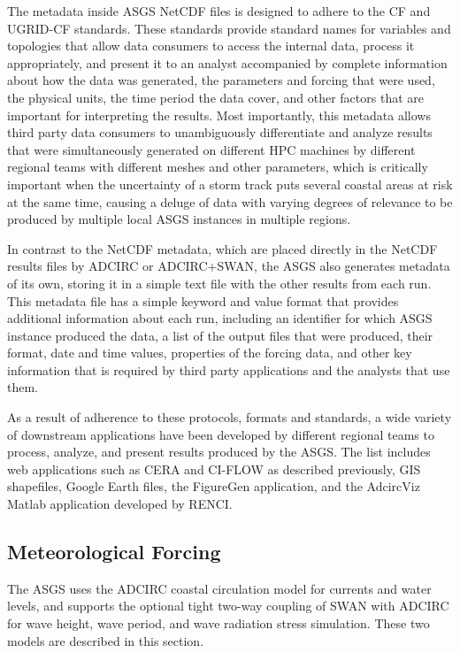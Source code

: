 \documentclass[jmse,article,submit,moreauthors,pdftex,12pt,a4paper]{mdpi}
\begin{document}
The metadata inside ASGS NetCDF files is designed to adhere to the 
CF and UGRID-CF standards. These standards provide standard names 
for variables and topologies that allow data consumers to access the 
internal data, process it appropriately, and present it to an 
analyst accompanied by complete information about how the data was 
generated, the parameters and forcing that were used, the physical 
units, the time period the data cover, and other factors that are 
important for interpreting the results. Most importantly, this 
metadata allows third party data consumers to unambiguously 
differentiate and analyze results that were simultaneously generated 
on different HPC machines by different regional teams with different 
meshes and other parameters, which is critically important when the 
uncertainty of a storm track puts several coastal areas at risk at 
the same time, causing a deluge of data with varying degrees of 
relevance to be produced by multiple local ASGS instances in multiple
regions. 

In contrast to the NetCDF metadata, which are placed directly in the 
NetCDF results files by ADCIRC or ADCIRC+SWAN, the ASGS also 
generates metadata of its own, storing it in a simple text file with 
the other results from each run. This metadata file has a simple 
keyword and value format that provides additional information about 
each run, including an identifier for which ASGS instance produced 
the data, a list of the output files that were produced, their 
format, date and time values, properties of the forcing data, and 
other key information that is required by third party applications 
and the analysts that use them. 

As a result of adherence to these protocols, formats and standards, 
a wide variety of downstream applications have been developed by 
different regional teams to process, analyze, and present results 
produced by the ASGS. The list includes web applications such as 
CERA and CI-FLOW as described previously, GIS shapefiles, Google 
Earth files, the FigureGen\cite{DietrichJC2013} application, and the 
AdcircViz Matlab application developed by RENCI.

\subsection{Meteorological Forcing}

The ASGS uses the ADCIRC coastal circulation model for currents and 
water levels, and supports the optional tight two-way coupling of 
SWAN with ADCIRC for wave height, wave period, and wave radiation 
stress simulation. These two models are described in this section. 
\end{document}
